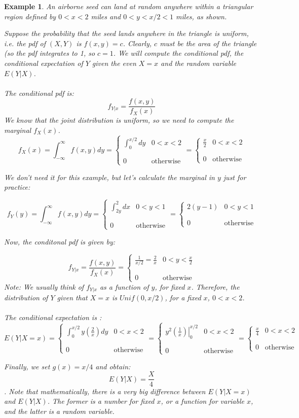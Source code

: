 \documentclass[12pt]{article} %
\newcommand{\infi}{\int_{-\infty}^\infty}
\newcommand{\pdf}[2]{\left\{\begin{matrix}
{#1} & {#2}\\\\\\0&\textrm{otherwise}
\end{matrix}\right.}
\newtheorem{example}{Example}
\begin{document}
\begin{example}
An airborne seed can land at random anywhere within a triangular region defined by $0<x<2$ miles and $0<y<x/2<1$ miles, as shown.


Suppose the probability that the seed lands anywhere in the triangle is uniform, i.e. the pdf of $(X,Y)$ is $f(x,y) = c$. Clearly, $c$ must be the area of the triangle (so the pdf integrates to 1, so $c=1$. We will compute the conditional pdf, the conditional expectation of $Y$ given the even $X=x$ and the random variable $E(Y|X)$.\\\\
The conditional pdf is:
$$f_{Y|x} = \frac{f(x,y)}{f_X(x)}$$
We know that the joint distribution is uniform, so we need to compute the marginal $f_X(x)$.\\
$$f_X(x) = \infi f(x,y) dy = \pdf{\int_0^{x/2} dy}{0<x<2} = \pdf{\frac{x}{2}}{0<x<2}$$

We don't need it for this example, but let's calculate the marginal in $y$ just for practice:

$$f_Y(y) = \infi f(x,y) dy = \pdf{\int_{2y}^{2} dx}{0<y<1} = \pdf{2(y-1)}{0<y<1}$$

Now, the conditonal pdf is given by:

$$f_{Y|x} = \frac{f(x,y)}{f_X(x)} = \pdf{\frac1{x/2}=\frac2x}{0<y<\frac{x}2}$$
Note: We usually think of $f_{Y|x}$ as a function of $y$, for fixed $x$. Therefore, the distribution of $Y$ given that $X=x$ is $Unif(0,x/2)$, for a fixed $x$, $0<x<2$.\\\\
The conditional expectation is :
$$E(Y|X=x) = \pdf{\int_0^{x/2} y \left(\frac2x\right) dy}{0<x<2} = \pdf{\left.y^2\left(\frac{1}{x}\right)\right\lvert_0^{x/2}}{0<x<2} = \pdf{\frac{x}{4}}{0<x<2}$$

Finally, we set $g(x) = x/4$ and obtain:
$$E(Y|X) = \frac{X}4$$.
Note that mathematically, there is a \emph{very big difference} between $E(Y|X=x)$ and $E(Y|X)$. The former is a number for fixed $x$, or a function for variable $x$, and the latter is a random variable.
\end{example}
\end{document}
